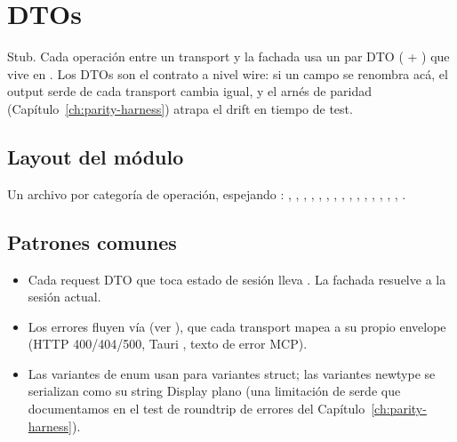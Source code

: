 \chapter{DTOs}
\label{ch:dtos}

\begin{note}
Stub. Cada operación entre un transport y la fachada usa un par
DTO ( + ) que vive en
. Los DTOs son el contrato
a nivel wire: si un campo se renombra acá, el output serde de
cada transport cambia igual, y el arnés de paridad
(Capítulo~\ref{ch:parity-harness}) atrapa el drift en tiempo de
test.
\end{note}

\section{Layout del módulo}

Un archivo por categoría de operación, espejando
: , ,
, , ,
, , ,
, , ,
, , ,
, .

\section{Patrones comunes}

\begin{itemize}
    \item Cada request DTO que toca estado de sesión lleva
        . La fachada
        resuelve  a la sesión actual.
    \item Los errores fluyen vía  (ver
        ), que cada
        transport mapea a su propio envelope (HTTP 400/404/500,
        Tauri , texto de error MCP).
    \item Las variantes de enum usan \code{\#[serde(tag =
        "kind")]} para variantes struct; las variantes newtype
        se serializan como su string Display plano (una
        limitación de serde que documentamos en el test de
        roundtrip de errores del
        Capítulo~\ref{ch:parity-harness}).
\end{itemize}

